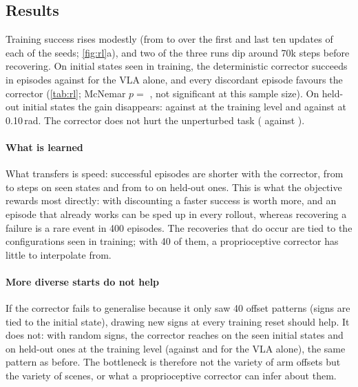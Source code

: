 \documentclass[10pt,twocolumn,letterpaper]{article}
\begin{document}
\begin{table}[t]
\centering
\caption{\textbf{Residual RL evaluation} (successes / episodes, offset in rad per joint). ``Re-plan / 10''
executes 10 instead of 50 actions per chunk, without any learning. s0--s2: residual seeds with fixed
offset signs per initial state; rs0--rs1: trained with new random signs at every reset.}
\label{tab:rl}
\scriptsize
\setlength{\tabcolsep}{3pt}
\resizebox{\columnwidth}{!}{}
\end{table}

\subsection{Results}
Training success rises modestly (from \RLTrainFirst{} to \RLTrainLast{} over the first and last ten updates
of each of the \SeedsWord{} seeds; \cref{fig:rl}a), and two of the three runs dip around 70k steps before
recovering. On initial states seen in training, the deterministic
corrector succeeds in \RLSeenRes{} episodes against \RLSeenVla{} for the VLA alone, and every discordant
episode favours the corrector (\cref{tab:rl}; McNemar $p=$ \RLPSeen{}, not significant at this sample
size). On held-out initial states the gain disappears: \RLUnseenRes{} against \RLUnseenVla{} at the training
level and \RLUnseenStrongRes{} against \RLUnseenStrongVla{} at 0.10\,rad. The corrector does not hurt the
unperturbed task (\RLUnseenCleanRes{} against \RLUnseenCleanVla{}).

\paragraph{What is learned} What transfers is speed: successful episodes are shorter with the corrector,
from \RLStepsSeenVla{} to \RLStepsSeenRes{} steps on seen states and from \RLStepsUnseenVla{} to
\RLStepsUnseenRes{} on held-out ones. This is what the objective rewards most directly: with discounting a
faster success is worth more, and an episode that already works can be sped up in every rollout, whereas
recovering a failure is a rare event in 400 episodes. The recoveries that do occur are tied to the
configurations seen in training; with 40 of them, a proprioceptive corrector has little to interpolate from.

\paragraph{More diverse starts do not help} If the corrector fails to generalise because it only saw 40
offset patterns (signs are tied to the initial state), drawing new signs at every training reset should
help. It does not: with random signs, the corrector reaches \RLRandSeenRes{} on the seen initial states and
\RLRandUnseenRes{} on held-out ones at the training level (against \RLSeenVla{} and \RLUnseenVla{} for the VLA
alone), the same pattern as before. The bottleneck is therefore not the variety of arm offsets but the
variety of scenes, or what a proprioceptive corrector can infer about them.
\end{document}

